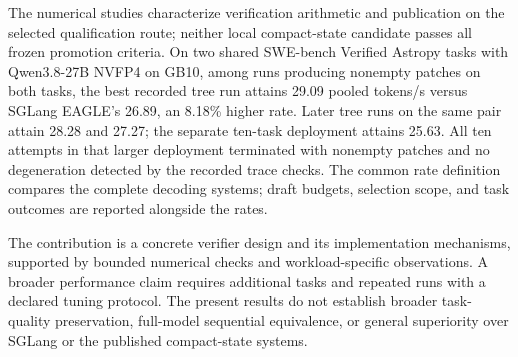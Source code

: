 \documentclass[conference]{IEEEtran}
\begin{document}
The numerical studies characterize verification arithmetic and publication on the selected qualification route; neither local compact-state candidate passes all frozen promotion criteria. On two shared SWE-bench Verified Astropy tasks with Qwen3.8-27B NVFP4 on GB10, among runs producing nonempty patches on both tasks, the best recorded tree run attains 29.09 pooled tokens/s versus SGLang EAGLE's 26.89, an 8.18\% higher rate. Later tree runs on the same pair attain 28.28 and 27.27; the separate ten-task deployment attains 25.63. All ten attempts in that larger deployment terminated with nonempty patches and no degeneration detected by the recorded trace checks. The common rate definition compares the complete decoding systems; draft budgets, selection scope, and task outcomes are reported alongside the rates.

The contribution is a concrete verifier design and its implementation mechanisms, supported by bounded numerical checks and workload-specific observations. A broader performance claim requires additional tasks and repeated runs with a declared tuning protocol. The present results do not establish broader task-quality preservation, full-model sequential equivalence, or general superiority over SGLang or the published compact-state systems.
\end{document}
